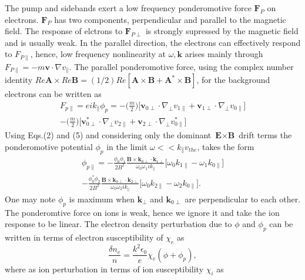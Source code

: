 \documentclass[aip,pop,amsmath,amssymb,showpacs,reprint,floatfix,lengthcheck]{revtex4-1}
\begin{document}
The pump and sidebands exert a low frequency ponderomotive force ${\textbf{F}_{P}}$ on electrons. ${\textbf{F}_{P}}$ has two components, perpendicular and parallel to the magnetic field. The response of elctrons to  ${\textbf{F}_{P\perp}}$ is strongly supressed by the magnetic field and is usually weak. In the parallel direction, the electrons can effectively respond to $F_{P\parallel}$, hence, low frequency nonlinearity at $\omega, \textbf{k}$ arises mainly through $F_{P\parallel}=-m\textbf{v}\cdot\nabla v_{\parallel}$.
The parallel ponderomotive force, using the complex number identity $Re \textbf{A} \times Re \textbf{B}=(1/2) Re [\textbf{A}\times \textbf{B}+ \textbf{A}^*\times \textbf{B}]$, for the background electrons can be written as 
\begin{eqnarray}
 F_{p\parallel}=ei k_{\parallel}\phi _{p}= -\biggl(\frac{m}{2}\biggr)\biggl[\textbf{v}_{0\perp}\cdot\nabla_{\perp}v_{1\parallel}+\textbf{v}_{1\perp}\cdot\nabla_{\perp}v_{0\parallel}\biggr]\nonumber\\
-\biggl(\frac{m}{2}\biggr)\biggl[\textbf{v}_{0\perp}^{*}\cdot\nabla_{\perp}v_{2\parallel}+\textbf{v}_{2\perp}\cdot\nabla_{\perp}v_{0\parallel}^{*}\biggr]\quad
\end{eqnarray}
Using Eqs.(2) and (5) and considering only the dominant $\textbf{E}\times\textbf{B}$ drift terms the ponderomotive potential $\phi_{p}$  in the limit $\omega<<k_{\parallel}v_{the}$, takes the form
\begin{eqnarray}
 \phi_{p\parallel}=-\frac{\phi_{0}\phi_{1}}{2B^2}\frac{\textbf{B}\times \textbf{k}_{0\perp}\cdot \textbf{k}_{1\perp}}{\omega_{0}\omega_{1}ik_{\parallel}}\biggl[\omega_{0}k_{1\parallel}-\omega_{1}k_{0\parallel}\biggr]\nonumber\\
-\frac{\phi_{0}^{*}\phi_{2}}{2B^2}\frac{\textbf{B}\times \textbf{k}_{0\perp}\cdot \textbf{k}_{2\perp}}{\omega_{0}\omega_{2}ik_{\parallel}}\biggl[\omega_{0}k_{2\parallel}-\omega_{2}k_{0\parallel}\biggr].
\end{eqnarray}
One may note $\phi_{p}$ is  maximum when $\textbf{k}_{\perp}$ and $\textbf{k}_{0\perp}$ are perpendicular to each other. The ponderomtive force on ions is weak, hence we ignore it and take the ion response to be linear.
The electron density perturbation due to $\phi$ and $\phi_{p}$ can be written in terms of electron susceptibility of $\chi_{e}$ as 
\begin{equation}
  \frac{\delta n_{e}}{n}=\frac{k^2\epsilon_{0}}{e}\chi_{e}(\phi+\phi_{p}),
\end{equation}
where as ion perturbation in terms of ion susceptibility $\chi_{i}$ as 
\end{document}
